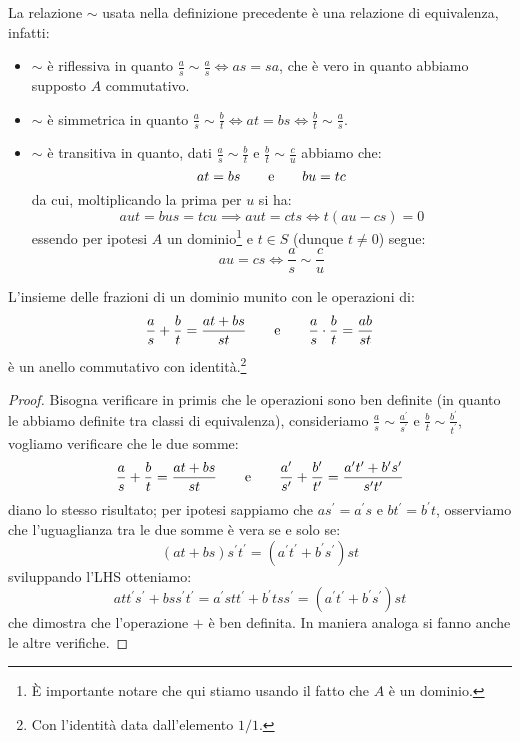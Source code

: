 \documentclass[11pt]{scrartcl}
\begin{document}
\begin{remark}
    La relazione $\sim$ usata nella definizione precedente è una relazione di equivalenza, infatti:
    \begin{itemize}
        \item $\sim$ è riflessiva in quanto $\displaystyle\frac{a}{s} \sim \frac{a}{s} \iff as = sa$, che è vero in quanto abbiamo supposto $A$ commutativo.
        \item $\sim$ è simmetrica in quanto $\displaystyle\frac{a}{s} \sim \frac{b}{t} \iff at = bs \iff \frac{b}{t} \sim \frac{a}{s}$.
        \item $\sim$ è transitiva in quanto, dati $\displaystyle\frac{a}{s} \sim \frac{b}{t}$ e $\displaystyle\frac{b}{t} \sim \frac{c}{u}$ abbiamo che:
            \[ at = bs \qquad \text e \qquad bu = tc
                \]
        da cui, moltiplicando la prima per $u$ si ha:
            \[ aut = bus = tcu \implies aut = cts \iff t(au-cs) = 0
                \]
        essendo per ipotesi $A$ un dominio\footnote{È importante notare che qui stiamo usando il fatto che $A$ è un dominio.} e $t \in S$ (dunque $t \ne 0$) segue:
            \[ au = cs \iff \frac{a}{s} \sim \frac{c}{u}
                \]
    \end{itemize}
\end{remark}

\begin{proposition}
    L'insieme delle frazioni di un dominio munito con le operazioni di:
    \[ \frac{a}{s} + \frac{b}{t} = \frac{at+bs}{st} \qquad \text e \qquad \frac{a}{s} \cdot \frac{b}{t} = \frac{ab}{st}
        \]
    è un anello commutativo con identità.\footnote{Con l'identità data dall'elemento $1/1$.}
\end{proposition}

\begin{proof}
    Bisogna verificare in primis che le operazioni sono ben definite (in quanto le abbiamo definite tra classi di equivalenza), consideriamo $\displaystyle\frac{a}{s}\sim\frac{a^{\prime}}{s^{\prime}}$ e
    $\displaystyle\frac{b}{t}\sim\frac{b^{\prime}}{t^{\prime}}$, vogliamo verificare che le due somme:
    \[ \frac{a}{s} + \frac{b}{t} = \frac{at+bs}{st} \qquad \text e \qquad \frac{a^{\prime}}{s^{\prime}} + \frac{b^{\prime}}{t^{\prime}} = \frac{a^{\prime}t^{\prime}+b^{\prime}s^{\prime}}{s^{\prime}t^{\prime}}
        \]
    diano lo stesso risultato; per ipotesi sappiamo che $as^{\prime}=a^{\prime}s$ e $bt^{\prime}=b^{\prime}t$, osserviamo che l'uguaglianza tra le due somme è vera se e solo se:
    \[ (at+bs)s^{\prime}t^{\prime} = (a^{\prime}t^{\prime}+b^{\prime}s^{\prime})st
        \]
    sviluppando l'LHS otteniamo:
    \[ att^{\prime}s^{\prime} + bss^{\prime}t^{\prime} = a^{\prime}stt^{\prime}+b^{\prime}tss^{\prime} = (a^{\prime}t^{\prime}+b^{\prime}s^{\prime})st
        \]
    che dimostra che l'operazione $+$ è ben definita. In maniera analoga si fanno anche le altre verifiche.
\end{proof}
\end{document}

